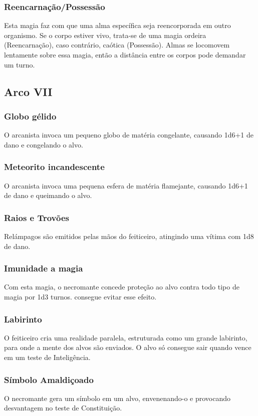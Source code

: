 \documentclass[10pt,twoside,twocolumn]{book}
\begin{document}
\subsubsection*{Reencarnação/Possessão}
Esta magia faz com que uma alma específica seja reencorporada em outro organismo. Se o corpo estiver vivo, trata-se de uma magia ordeira (Reencarnação), caso contrário, caótica (Possessão). Almas se locomovem lentamente sobre essa magia, então a distância entre os corpos pode demandar um turno.

\subsection*{Arco VII}
\subsubsection*{Globo gélido}
O arcanista invoca um pequeno globo de matéria congelante, causando 1d6+1 de dano e congelando o alvo.
\subsubsection*{Meteorito incandescente}
O arcanista invoca uma pequena esfera de matéria flamejante, causando 1d6+1 de dano e queimando o alvo.
\subsubsection*{Raios e Trovões}
Relámpagos são emitidos pelas mãos do feiticeiro, atingindo uma vítima com 1d8 de dano.
\subsubsection*{Imunidade a magia}
Com esta magia, o necromante concede proteção ao alvo contra todo tipo de magia por 1d3 turnos.
consegue evitar esse efeito.
\subsubsection*{Labirinto}
O feiticeiro cria uma realidade paralela, estruturada como um grande labirinto, para onde a mente dos alvos são enviados. O alvo só consegue sair quando vence em um teste de Inteligência.
\subsubsection*{Símbolo Amaldiçoado}
O necromante gera um símbolo em um alvo, envenenando-o e provocando desvantagem no teste de Constituição.
\end{document}
